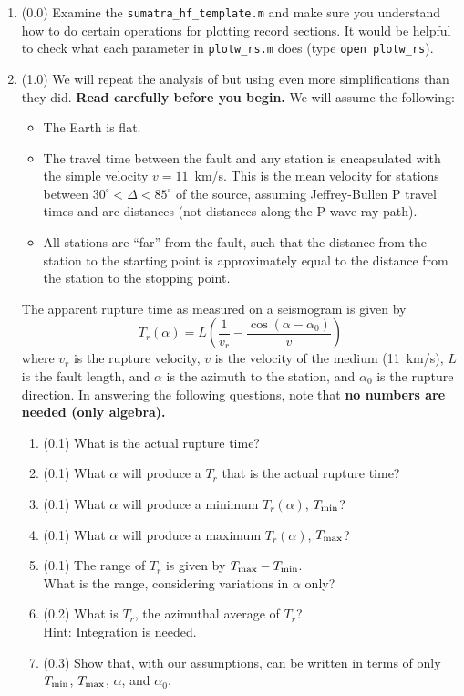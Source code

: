 \documentclass[11pt,titlepage,fleqn]{article}
\begin{document}
\begin{enumerate}
\item (0.0) Examine the \verb+sumatra_hf_template.m+ and make sure you understand how to do certain operations for plotting record sections. It would be helpful to check what each parameter in \verb+plotw_rs.m+ does (type \verb+open plotw_rs+).

\item (1.0) We will repeat the analysis of \citet{Ni2005} but using even more simplifications than they did. {\bf Read \citet{Ni2005} carefully before you begin.} We will assume the following:
%
\begin{itemize}
\item The Earth is flat.
\item The travel time between the fault and any station is encapsulated with the simple velocity $v = 11$~km/s. This is the mean velocity for stations between $30^\circ < \Delta < 85^\circ$ of the source, assuming Jeffrey-Bullen P travel times and arc distances (not distances along the P wave ray path).
\item All stations are ``far'' from the fault, such that the distance from the station to the starting point is approximately equal to the distance from the station to the stopping point.
\end{itemize}
%
The apparent rupture time as measured on a seismogram is given by \citep[][Section 4.3.2]{SteinWysession}
%
\begin{equation}
T_r(\alpha) = L\left(\frac{1}{v_r} - \frac{\cos(\alpha-\alpha_0)}{v}\right)
\label{Tr}
\end{equation}
%
where $v_r$ is the rupture velocity, $v$ is the velocity of the medium (11~km/s), $L$ is the fault length, and $\alpha$ is the azimuth to the station, and $\alpha_0$ is the rupture direction. In answering the following questions, note that {\bf no numbers are needed (only algebra).}
%
\begin{enumerate}
\item (0.1) What is the actual rupture time?
\item (0.1) What $\alpha$ will produce a $T_r$ that is the actual rupture time?
\item (0.1) What $\alpha$ will produce a minimum $T_r(\alpha)$, $T_{\rm min}$?
\item (0.1) What $\alpha$ will produce a maximum $T_r(\alpha)$, $T_{\rm max}$?
\item (0.1) The range of $T_r$ is given by $T_{\rm max} - T_{\rm min}$. \\
What is the range, considering variations in $\alpha$ only?
\item (0.2) What is $\overline{T}_r$, the azimuthal average of $T_r$? \\
Hint: Integration is needed.
\item (0.3) Show that, with our assumptions,  can be written in terms of only $T_{\rm min}$, $T_{\rm max}$, $\alpha$, and $\alpha_0$.


\end{enumerate}
\end{enumerate}
\end{document}
